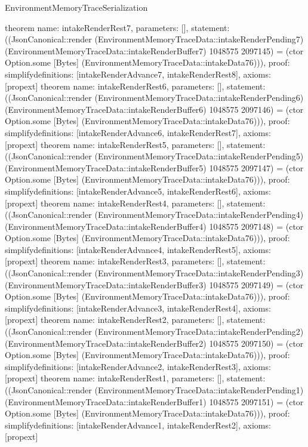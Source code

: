 \begin{lexlean}{EnvironmentMemoryTraceSerialization}
\begin{semanticmodule}
{}
theorem{
 name: intakeRenderRest7, parameters: [],
 statement: ((JsonCanonical::render (EnvironmentMemoryTraceData::intakeRenderPending7) (EnvironmentMemoryTraceData::intakeRenderBuffer7) 1048575 2097145) = (ctor Option.some [Bytes] (EnvironmentMemoryTraceData::intakeData76))), proof: simplify{definitions: [intakeRenderAdvance7, intakeRenderRest8]}, axioms: [propext]
}
theorem{
 name: intakeRenderRest6, parameters: [],
 statement: ((JsonCanonical::render (EnvironmentMemoryTraceData::intakeRenderPending6) (EnvironmentMemoryTraceData::intakeRenderBuffer6) 1048575 2097146) = (ctor Option.some [Bytes] (EnvironmentMemoryTraceData::intakeData76))), proof: simplify{definitions: [intakeRenderAdvance6, intakeRenderRest7]}, axioms: [propext]
}
theorem{
 name: intakeRenderRest5, parameters: [],
 statement: ((JsonCanonical::render (EnvironmentMemoryTraceData::intakeRenderPending5) (EnvironmentMemoryTraceData::intakeRenderBuffer5) 1048575 2097147) = (ctor Option.some [Bytes] (EnvironmentMemoryTraceData::intakeData76))), proof: simplify{definitions: [intakeRenderAdvance5, intakeRenderRest6]}, axioms: [propext]
}
theorem{
 name: intakeRenderRest4, parameters: [],
 statement: ((JsonCanonical::render (EnvironmentMemoryTraceData::intakeRenderPending4) (EnvironmentMemoryTraceData::intakeRenderBuffer4) 1048575 2097148) = (ctor Option.some [Bytes] (EnvironmentMemoryTraceData::intakeData76))), proof: simplify{definitions: [intakeRenderAdvance4, intakeRenderRest5]}, axioms: [propext]
}
theorem{
 name: intakeRenderRest3, parameters: [],
 statement: ((JsonCanonical::render (EnvironmentMemoryTraceData::intakeRenderPending3) (EnvironmentMemoryTraceData::intakeRenderBuffer3) 1048575 2097149) = (ctor Option.some [Bytes] (EnvironmentMemoryTraceData::intakeData76))), proof: simplify{definitions: [intakeRenderAdvance3, intakeRenderRest4]}, axioms: [propext]
}
theorem{
 name: intakeRenderRest2, parameters: [],
 statement: ((JsonCanonical::render (EnvironmentMemoryTraceData::intakeRenderPending2) (EnvironmentMemoryTraceData::intakeRenderBuffer2) 1048575 2097150) = (ctor Option.some [Bytes] (EnvironmentMemoryTraceData::intakeData76))), proof: simplify{definitions: [intakeRenderAdvance2, intakeRenderRest3]}, axioms: [propext]
}
theorem{
 name: intakeRenderRest1, parameters: [],
 statement: ((JsonCanonical::render (EnvironmentMemoryTraceData::intakeRenderPending1) (EnvironmentMemoryTraceData::intakeRenderBuffer1) 1048575 2097151) = (ctor Option.some [Bytes] (EnvironmentMemoryTraceData::intakeData76))), proof: simplify{definitions: [intakeRenderAdvance1, intakeRenderRest2]}, axioms: [propext]
}
\end{semanticmodule}
\end{lexlean}
